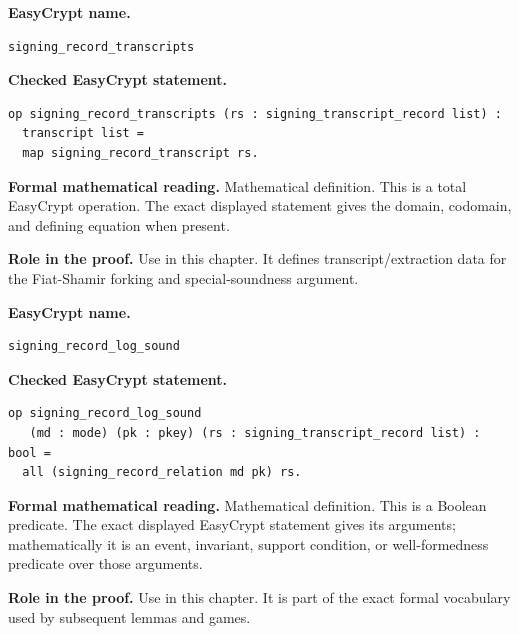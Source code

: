 \begin{formaldefinition}
\noindent\textbf{EasyCrypt name.}
\begin{lstlisting}[language=EasyCrypt,basicstyle=\ttfamily\scriptsize]
signing_record_transcripts
\end{lstlisting}
\noindent\textbf{Checked EasyCrypt statement.}
\begin{lstlisting}[language=EasyCrypt,basicstyle=\ttfamily\scriptsize]
op signing_record_transcripts (rs : signing_transcript_record list) :
  transcript list =
  map signing_record_transcript rs.
\end{lstlisting}
\noindent\textbf{Formal mathematical reading.}
Mathematical definition. This is a total EasyCrypt operation.  The exact displayed statement gives the domain, codomain, and defining equation when present.

\noindent\textbf{Role in the proof.}
Use in this chapter. It defines transcript/extraction data for the Fiat-Shamir forking and special-soundness argument.

\end{formaldefinition}

\begin{formaldefinition}
\noindent\textbf{EasyCrypt name.}
\begin{lstlisting}[language=EasyCrypt,basicstyle=\ttfamily\scriptsize]
signing_record_log_sound
\end{lstlisting}
\noindent\textbf{Checked EasyCrypt statement.}
\begin{lstlisting}[language=EasyCrypt,basicstyle=\ttfamily\scriptsize]
op signing_record_log_sound
   (md : mode) (pk : pkey) (rs : signing_transcript_record list) : bool =
  all (signing_record_relation md pk) rs.
\end{lstlisting}
\noindent\textbf{Formal mathematical reading.}
Mathematical definition. This is a Boolean predicate.  The exact displayed EasyCrypt statement gives its arguments; mathematically it is an event, invariant, support condition, or well-formedness predicate over those arguments.

\noindent\textbf{Role in the proof.}
Use in this chapter. It is part of the exact formal vocabulary used by subsequent lemmas and games.

\end{formaldefinition}

